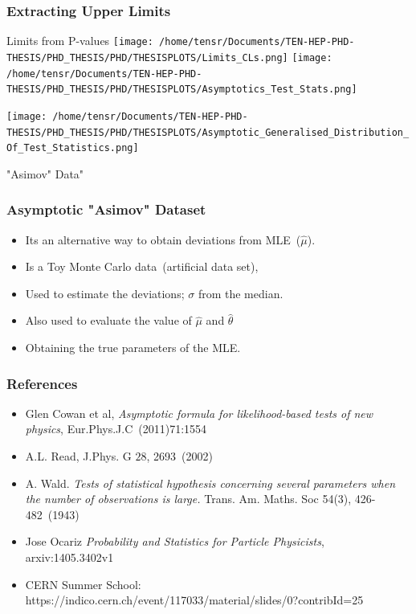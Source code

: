 \documentclass[12pt]{beamer}
\begin{document}
\begin{frame}
\frametitle{Extracting Upper Limits}
 \begin{varblock}[8cm]{Limits from P-values}
  \texttt{[image: /home/tensr/Documents/TEN-HEP-PHD-THESIS/PHD\_THESIS/PHD/THESISPLOTS/Limits\_CLs.png]}
  \texttt{[image: /home/tensr/Documents/TEN-HEP-PHD-THESIS/PHD\_THESIS/PHD/THESISPLOTS/Asymptotics\_Test\_Stats.png]}
 \end{varblock}
\end{frame}

\begin{frame}
 \centering
  \texttt{[image: /home/tensr/Documents/TEN-HEP-PHD-THESIS/PHD\_THESIS/PHD/THESISPLOTS/Asymptotic\_Generalised\_Distribution\_Of\_Test\_Statistics.png]}
\end{frame}


\begin{frame}
\begin{varblock}[8cm]{"Asimov" Data"}
\frametitle{Asymptotic "Asimov" Dataset}
\begin{itemize}
\item Its an alternative way to obtain deviations from MLE~($\hat{\mu}$).
\item Is a Toy Monte Carlo data~(artificial data set),
\item Used to estimate the deviations; $\sigma$ from the median.
\item Also used to evaluate the value of $\hat{\mu}$ and $\hat{\theta}$
\item Obtaining the true parameters of the MLE.
\end{itemize}
\end{varblock}
\end{frame}


\begin{frame}
\frametitle{References}
\begin{itemize}
\item  Glen Cowan et al, \textit{Asymptotic formula for likelihood-based tests of new physics}, Eur.Phys.J.C~(2011)71:1554
\item A.L. Read, J.Phys. G $28$, 2693~(2002)
\item A. Wald. \textit{Tests of statistical hypothesis concerning several parameters when the number of observations is large.} Trans. Am. Maths. Soc 54(3), 426-482~(1943)
\item  Jose Ocariz \textit{Probability and Statistics for Particle Physicists}, arxiv:1405.3402v1
\item CERN Summer School: \tiny{https://indico.cern.ch/event/117033/material/slides/0?contribId=25}
\end{itemize}
\end{frame}
\end{document}
